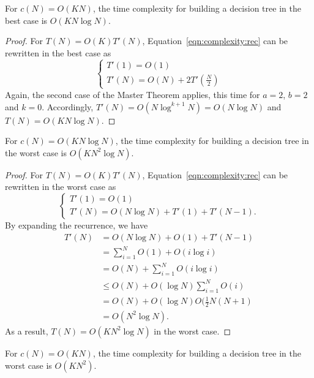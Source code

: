 \begin{theorem}\label{thm:6:best:kn}
For $c(N)=O(K N)$, the time complexity for building a decision
tree in the best case is $O(K N \log N)$.
\end{theorem}

\begin{proof}
For $T(N) = O(K)T'(N)$, Equation~\ref{eqn:complexity:rec}
can be rewritten in the best case as
\begin{equation}
\begin{cases}
T'(1) = O(1) \\
T'(N) = O(N) + 2 T'(\frac{N}{2})
\end{cases}
\end{equation}
Again, the second case of the Master Theorem applies, this time for $a=2$, $b=2$ and $k=0$.
Accordingly, $T'(N)=O(N\log^{k+1} N)=O(N\log N)$ and $T(N) = O(K N\log N)$.
\end{proof}

\begin{theorem}\label{thm:6:worst:knlogn}
For $c(N)=O(K N\log N)$, the time complexity for building a decision
tree in the worst case is $O(K N^2 \log N)$.
\end{theorem}

\begin{proof}
For $T(N) = O(K)T'(N)$, Equation~\ref{eqn:complexity:rec}
can be rewritten in the worst case as
\begin{equation}
\begin{cases}
T'(1) = O(1) \\
T'(N) = O(N\log N) +  T'(1) + T'(N-1).
\end{cases}
\end{equation}
By expanding the recurrence, we have
\begin{align}
T'(N) &= O(N\log N) + O(1) + T'(N-1) \nonumber \\
      &= \sum_{i=1}^N O(1) + O(i\log i) \nonumber \\
      &= O(N) + \sum_{i=1}^N O(i\log i) \nonumber \\
      &\leq O(N) + O(\log N) \sum_{i=1}^N O(i) \nonumber \\
      &= O(N) + O(\log N) O(\frac{1}{2} N(N+1) \nonumber \\
      &= O(N^2 \log N).
\end{align}
As a result, $T(N) = O(K N^2 \log N)$ in the worst case.
\end{proof}

\begin{theorem}\label{thm:6:worst:kn}
For $c(N)=O(K N)$, the time complexity for building a decision
tree in the worst case is $O(K N^2)$.
\end{theorem}

